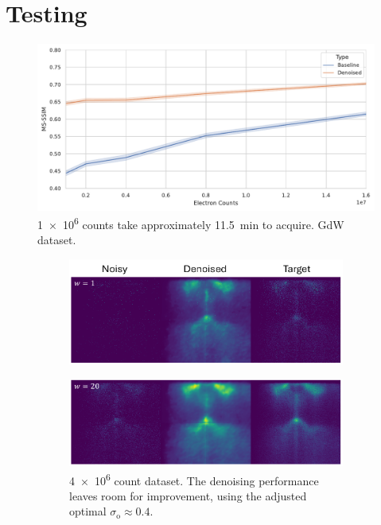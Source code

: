 \section{Testing}
\begin{figure}[h]
    \centering
    \includegraphics[width=1\linewidth]{images/nn_gdw_msssim.pdf}
    \caption{\num{1e6} counts take approximately \qty{11.5}{min} to acquire. \gls{GdW} dataset.}
    \label{fig:gdw-test-metirc}
\end{figure}


\begin{figure}
    \centering
    \begin{subfigure}[b]{1\linewidth}
        \centering
        \includegraphics[width=1\linewidth]{images/nn_denoised_ex_w_1.pdf}
        \caption{}
        \label{fig:nn-denoised-ex-w-1}
    \end{subfigure}

    \begin{subfigure}[b]{1\linewidth}
        \centering
        \includegraphics[width=1\linewidth]{images/nn_denoised_ex_w_20.pdf}
        \caption{\num{4e6} count dataset. The denoising performance leaves room for improvement, using the adjusted optimal $\sigma_{\text{o}}\approx0.4$.}
        \label{fig:nn-denoised-ex-w-20}
    \end{subfigure}
    \caption{}
    \label{fig:nn-denoised-ex-w}
\end{figure}

